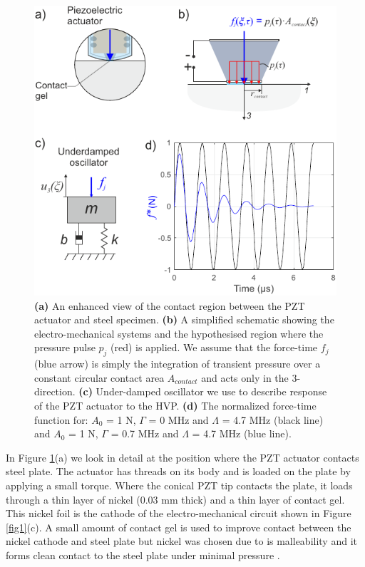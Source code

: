 \documentclass[preprint,3p, 11pt,authoryear]{elsarticle}
\begin{document}
\begin{figure}[ht]
     	\centering
\includegraphics[scale= 0.9]{FIG2b.pdf} 
\caption{\textbf{(a)} An enhanced view of the contact region between the PZT actuator and steel specimen. \textbf{(b)} A simplified schematic showing the electro-mechanical systems and the hypothesised region where the pressure pulse $p_{j}$ (red) is applied. We assume that the force-time $f_{j}$ (blue arrow) is simply the integration of transient pressure over a constant circular contact area $A_{contact}$ and acts only in the 3-direction.  \textbf{(c)} Under-damped oscillator we use to describe response of the PZT actuator to the HVP. \textbf{(d)} The normalized force-time function for: $A_{0}$ = 1 N, $\Gamma$ = 0 MHz and $\Lambda$ = 4.7 MHz (black line) and $A_{0}$ = 1 N, $\Gamma$ = 0.7 MHz and $\Lambda$ = 4.7 MHz (blue line).}
	\label{fig2b} 
\end{figure}

In Figure \ref{fig2b}(a) we look in detail at the position where the PZT actuator contacts steel plate. The actuator has threads on its body and is loaded on the plate by applying a small torque. Where the conical PZT tip contacts the plate, it loads through a thin layer of nickel (0.03 mm thick) and a thin layer of contact gel. This nickel foil is the cathode of the electro-mechanical circuit shown in Figure \ref{fig1}(c). A small amount of contact gel is used to improve contact between the nickel cathode and steel plate but nickel was chosen due to is malleability and it forms clean contact to the steel plate under minimal pressure \citep{Glaser1998}. 
\end{document}
